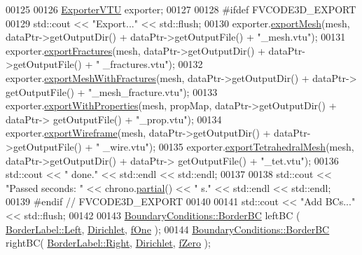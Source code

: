 \begin{DoxyCode}
00125 
00126     \hyperlink{classFVCode3D_1_1ExporterVTU}{ExporterVTU} exporter;
00127 
00128 \textcolor{preprocessor}{#ifdef FVCODE3D\_EXPORT}
00129     std::cout << \textcolor{stringliteral}{"Export..."} << std::flush;
00130     exporter.\hyperlink{classFVCode3D_1_1ExporterVTU_a8e5eff8e388cf6de1bf1c1deca863ac7}{exportMesh}(mesh, dataPtr->getOutputDir() + dataPtr->getOutputFile() + \textcolor{stringliteral}{"\_mesh.vtu"});
00131     exporter.\hyperlink{classFVCode3D_1_1ExporterVTU_abdb2e3f36907610720d698d9bfa9428d}{exportFractures}(mesh, dataPtr->getOutputDir() + dataPtr->getOutputFile() + \textcolor{stringliteral}{"
      \_fractures.vtu"});
00132     exporter.\hyperlink{classFVCode3D_1_1ExporterVTU_a5af587a4d971f4d41caecbef3477211b}{exportMeshWithFractures}(mesh, dataPtr->getOutputDir() + dataPtr->
      getOutputFile() + \textcolor{stringliteral}{"\_mesh\_fracture.vtu"});
00133     exporter.\hyperlink{classFVCode3D_1_1ExporterVTU_a12240c4de9e7b3a5bf8f513c873c4547}{exportWithProperties}(mesh, propMap, dataPtr->getOutputDir() + dataPtr->
      getOutputFile() + \textcolor{stringliteral}{"\_prop.vtu"});
00134     exporter.\hyperlink{classFVCode3D_1_1ExporterVTU_a672c00cd380554714d09d5d9b0b56a24}{exportWireframe}(mesh, dataPtr->getOutputDir() + dataPtr->getOutputFile() + \textcolor{stringliteral}{"
      \_wire.vtu"});
00135     exporter.\hyperlink{classFVCode3D_1_1ExporterVTU_ac043bd93a6a079f864bc1b76a21df6a2}{exportTetrahedralMesh}(mesh, dataPtr->getOutputDir() + dataPtr->
      getOutputFile() + \textcolor{stringliteral}{"\_tet.vtu"});
00136     std::cout << \textcolor{stringliteral}{" done."} << std::endl << std::endl;
00137 
00138     std::cout << \textcolor{stringliteral}{"Passed seconds: "} << chrono.\hyperlink{classFVCode3D_1_1Chrono_a245a0c47da85e80de56e85d3689b925b}{partial}() << \textcolor{stringliteral}{" s."} << std::endl << std::endl;
00139 \textcolor{preprocessor}{#endif // FVCODE3D\_EXPORT}
00140 
00141     std::cout << \textcolor{stringliteral}{"Add BCs..."} << std::flush;
00142 
00143     \hyperlink{classFVCode3D_1_1BoundaryConditions_1_1BorderBC}{BoundaryConditions::BorderBC} leftBC (
      \hyperlink{namespaceFVCode3D_a604c2047b7f400e68b30a8132178c822a7fd633652b3723bb7716b9db0314a61e}{BorderLabel::Left}, \hyperlink{namespaceFVCode3D_a73660061f11f1671164ce171a053f8c5a192024697bdaa4fbbb39b8961b747bce}{Dirichlet}, \hyperlink{namespaceFVCode3D_a1a9ede09c77441d292a079fbab60fb82}{fOne} );
00144     \hyperlink{classFVCode3D_1_1BoundaryConditions_1_1BorderBC}{BoundaryConditions::BorderBC} rightBC(
      \hyperlink{namespaceFVCode3D_a604c2047b7f400e68b30a8132178c822a27ec5db52b31c4eba9e240374723f76e}{BorderLabel::Right}, \hyperlink{namespaceFVCode3D_a73660061f11f1671164ce171a053f8c5a192024697bdaa4fbbb39b8961b747bce}{Dirichlet}, \hyperlink{namespaceFVCode3D_a2e72cc81c6f214d6e057af7a02599501}{fZero} );

\end{DoxyCode}
